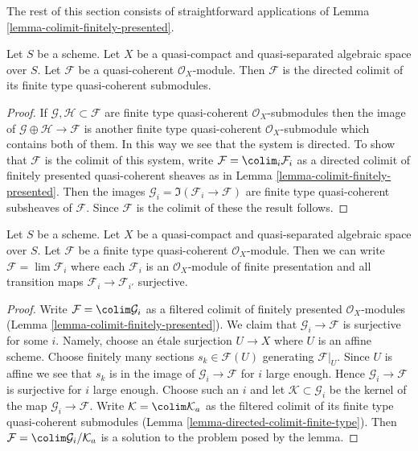 \noindent
The rest of this section consists of straightforward
applications of Lemma \ref{lemma-colimit-finitely-presented}.

\begin{lemma}
\label{lemma-directed-colimit-finite-type}
Let $S$ be a scheme. Let $X$ be a quasi-compact and quasi-separated
algebraic space over $S$.
Let $\mathcal{F}$ be a quasi-coherent $\mathcal{O}_X$-module.
Then $\mathcal{F}$ is the directed colimit of its finite type
quasi-coherent submodules.
\end{lemma}

\begin{proof}
If $\mathcal{G}, \mathcal{H} \subset \mathcal{F}$ are finite type
quasi-coherent $\mathcal{O}_X$-submodules then the image
of $\mathcal{G} \oplus \mathcal{H} \to \mathcal{F}$ is another
finite type quasi-coherent $\mathcal{O}_X$-submodule which contains
both of them. In this way we see that the system is directed.
To show that $\mathcal{F}$ is the colimit of this system, write
$\mathcal{F} = \colim_i \mathcal{F}_i$ as a directed
colimit of finitely presented quasi-coherent sheaves as in
Lemma \ref{lemma-colimit-finitely-presented}.
Then the images $\mathcal{G}_i = \Im(\mathcal{F}_i \to \mathcal{F})$ are
finite type quasi-coherent subsheaves of $\mathcal{F}$. Since
$\mathcal{F}$ is the colimit of these the result follows.
\end{proof}

\begin{lemma}
\label{lemma-finite-directed-colimit-surjective-maps}
Let $S$ be a scheme. Let $X$ be a quasi-compact and quasi-separated
algebraic space over $S$. Let $\mathcal{F}$ be a finite type
quasi-coherent $\mathcal{O}_X$-module. Then we can write
$\mathcal{F} = \lim \mathcal{F}_i$ where each $\mathcal{F}_i$ is an
$\mathcal{O}_X$-module of finite presentation and all transition maps
$\mathcal{F}_i \to \mathcal{F}_{i'}$ surjective.
\end{lemma}

\begin{proof}
Write $\mathcal{F} = \colim \mathcal{G}_i$ as a filtered colimit of
finitely presented $\mathcal{O}_X$-modules
(Lemma \ref{lemma-colimit-finitely-presented}).
We claim that $\mathcal{G}_i \to \mathcal{F}$ is surjective for some $i$.
Namely, choose an \'etale surjection $U \to X$ where $U$ is an affine scheme.
Choose finitely many sections $s_k \in \mathcal{F}(U)$ generating
$\mathcal{F}|_U$. Since $U$ is affine we see that $s_k$ is in the image
of $\mathcal{G}_i \to \mathcal{F}$ for $i$ large enough. Hence
$\mathcal{G}_i \to \mathcal{F}$ is surjective for $i$ large enough.
Choose such an $i$ and let $\mathcal{K} \subset \mathcal{G}_i$ be the
kernel of the map $\mathcal{G}_i \to \mathcal{F}$. Write
$\mathcal{K} = \colim \mathcal{K}_a$
as the filtered colimit of its finite type quasi-coherent submodules
(Lemma \ref{lemma-directed-colimit-finite-type}). Then
$\mathcal{F} = \colim \mathcal{G}_i/\mathcal{K}_a$ is a solution
to the problem posed by the lemma.
\end{proof}

